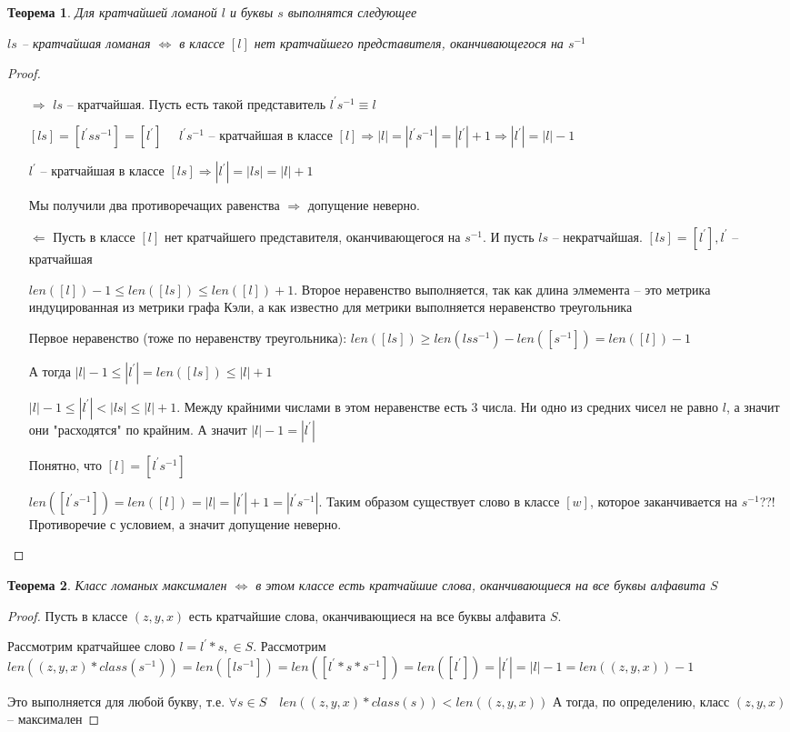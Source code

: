 \documentclass[12pt,a4paper, flushleft]{article}
\newtheorem{Th}{Теорема}[section]
\newcommand{\p}[1]{#1^{\prime}}
\begin{document}
\begin{Th}
	Для кратчайшей ломаной $l$ и буквы $s$ выполнятся следующее 
	
	$ls$ -- кратчайшая ломаная $\Longleftrightarrow$ в классе $[l]$ нет кратчайшего представителя, оканчивающегося на $s^{-1}$ 
\end{Th}
\begin{proof}
	\begin{itemize}
		\item[$\Rightarrow$] $ls$ -- кратчайшая. Пусть есть такой представитель $\p ls^{-1}\equiv l$
		
		$[ls] = [\p l s s^{-1}] = [\p l]$ $\quad \p ls^{-1}$ -- кратчайшая в классе $[l]\Rightarrow |l|=|\p l s^{-1}| = |\p l| + 1\Rightarrow |\p l| = |l|-1$
		
		$\p l$ -- кратчайшая в классе $[ls]\Rightarrow |\p l | = |ls| = |l| + 1$
		
		Мы получили два противоречащих равенства $\Rightarrow $ допущение неверно.
		\item[$\Leftarrow$] Пусть в классе $[l]$ нет кратчайшего представителя, оканчивающегося на $s^{-1}$. И пусть $ls$ -- некратчайшая. $[ls] = [\p l], \p l$ -- кратчайшая
		
		$len([l]) - 1 \leqslant len([ls])\leqslant len([l]) + 1$. Второе неравенство выполняется, так как длина элмемента -- это метрика индуцированная из метрики графа Кэли, а как известно для метрики выполняется неравенство треугольника
		
		Первое неравенство (тоже по неравенству треугольника): $len([ls])\geqslant len(lss^{-1}) - len([s^{-1}]) = len([l]) - 1$
		
		А тогда $|l|-1 \leqslant |\p l | = len([ls])\leqslant |l| + 1$
		
		$|l| - 1\leqslant |\p l |<|ls|\leqslant |l|+1$. Между крайними числами в этом неравенстве есть 3 числа. Ни одно из средних чисел не равно $l$, а значит они "расходятся" по крайним. А значит $|l|-1 = |\p l|$

		Понятно, что $[l] = [\p l s^{-1}]$		
		
		$len([\p ls^{-1}]) = len([l]) = |l| = |\p l| + 1 = |\p l s^{-1}|$. Таким образом существует слово в классе $[w]$, которое заканчивается на $s^{-1}$??! Противоречие с условием, а значит допущение неверно.
	\end{itemize}
\end{proof}

\begin{Th}
	Класс ломаных максимален $\Longleftrightarrow$ в этом классе есть кратчайшие слова, оканчивающиеся на все буквы алфавита $S$
\end{Th}
\begin{proof}
	Пусть в классе $(z, y, x)$ есть кратчайшие слова, оканчивающиеся на все буквы алфавита $S$. 
	
	Рассмотрим кратчайшее слово $l = \p l*s, \in S$. Рассмотрим $len((z, y, x) * class(s^{-1})) = len([ls^{-1}]) = len([\p l * s * s^{-1}]) = len([\p l]) = |\p l| = |l| - 1 = len((z, y, x)) - 1$
	
	Это выполняется для любой букву, т.е. $\forall s\in S\quad len((z, y, x) * class(s))<len((z, y, x))$ А тогда, по определению, класс $(z, y, x)$ -- максимален
\end{proof}
\end{document}
